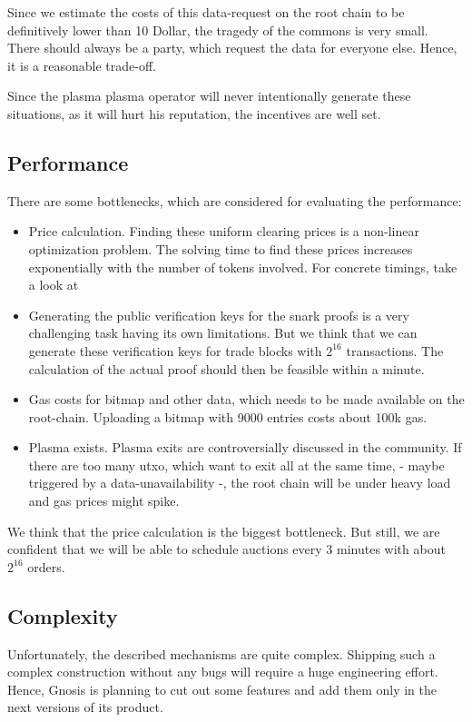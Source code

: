 \documentclass[11pt,parskip=full]{scrartcl}%
\begin{document}
Since we estimate the costs of this data-request on the root chain to be definitively lower than 10 Dollar, the tragedy of the commons is very small. 
There should always be a party, which request the data for everyone else. Hence, it is a reasonable trade-off. 

Since the plasma plasma operator will never intentionally generate these situations, as it will hurt his reputation, the incentives are well set. 

\subsection{Performance}
There are some bottlenecks, which are considered for evaluating the performance:
\begin{itemize}
\item Price calculation. 
Finding these uniform clearing prices is a non-linear optimization problem. 
The solving time to find these prices increases exponentially with the number of tokens involved. For concrete timings, take a look at \cite{priceOptimization}
\item Generating the public verification keys for the snark proofs is a very challenging task having its own limitations. 
But we think that we can generate these verification keys for trade blocks with $2^{16}$ transactions. 
The calculation of the actual proof should then be feasible within a minute. 
\item Gas costs for bitmap and other data, which needs to be made available on the root-chain. 
Uploading a bitmap with 9000 entries costs about 100k gas. 
\item Plasma exists.
Plasma exits are controversially discussed in the community. 
If there are too many utxo, which want to exit all at the same time, - maybe triggered by a data-unavailability -, the root chain will be under heavy load and gas prices might spike. 
\end{itemize}
We think that the price calculation is the biggest bottleneck. 
But still, we are confident that we will be able to schedule auctions every 3 minutes with about $2^{16}$ orders. 
\subsection{Complexity}
Unfortunately, the described mechanisms are quite complex. 
Shipping such a complex construction without any bugs will require a huge engineering effort. 
Hence, Gnosis is planning to cut out some features and add them only in the next versions of its product. 
\end{document}
